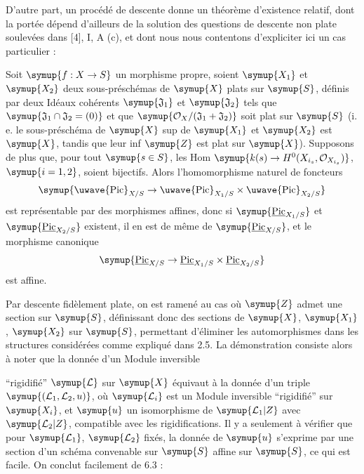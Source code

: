 D'autre part, un procédé de descente donne un théorème d'existence relatif,
dont la portée dépend d'ailleurs de la solution des questions de descente non
plate soulevées dans [4], I, A (c), et dont nous nous contentons d'expliciter
ici un cas particulier :

 Soit $\symup{f:X\to S}$ un morphisme propre,
soient $\symup{X_1}$ et $\symup{X_2}$ deux sous-préschémas de $\symup{X}$ plats sur $\symup{S}$, définis par
deux Idéaux cohérents $\symup{\mathfrak J_1}$ et $\symup{\mathfrak J_2}$ tels que
$\symup{\mathfrak J_1\cap\mathfrak J_2=(0)}$ et que
$\symup{\mathcal O_X/(\mathfrak J_1+\mathfrak J_2)}$ soit plat sur $\symup{S}$ (i. e. le
sous-préschéma de $\symup{X}$ sup de $\symup{X_1}$ et $\symup{X_2}$ est $\symup{X}$, tandis que leur inf $\symup{Z}$
est plat sur $\symup{X}$). Supposons de plus que, pour tout $\symup{s\in S}$, les Hom $\symup{k(s)\to H^0(X_{i_s},\mathcal O_{X_{i_s}})}$,
$\symup{i=1,2}$, soient bijectifs. Alors l'homomorphisme naturel de foncteurs
\[
\symup{\text{\uwave{Pic}}_{X/S}\to
\text{\uwave{Pic}}_{X_1/S}\times\text{\uwave{Pic}}_{X_2/S}}
\]
est représentable par des morphismes affines, donc si
$\symup{\underline{\operatorname{Pic}}_{X_1/S}}$ et $\symup{\underline{\operatorname{Pic}}_{X_2/S}}$ existent, il en
est de même de $\symup{\underline{\operatorname{Pic}}_{X/S}}$, et le morphisme canonique
\[
\symup{\underline{\operatorname{Pic}}_{X/S}\to
\underline{\operatorname{Pic}}_{X_1/S}\times\underline{\operatorname{Pic}}_{X_2/S}}
\]
est affine.

Par descente fidèlement plate, on est ramené au cas où $\symup{Z}$ admet une section
sur $\symup{S}$, définissant donc des sections de $\symup{X}$, $\symup{X_1}$, $\symup{X_2}$ sur $\symup{S}$,
permettant d'éliminer les automorphismes dans les structures considérées comme
expliqué dans 2.5. La démonstration consiste alors à noter que la donnée d'un
Module inversible

``rigidifié'' $\symup{\mathcal L}$ sur $\symup{X}$ équivaut à la donnée d'un triple
$\symup{(\mathcal L_1,\mathcal L_2,u)}$, où $\symup{\mathcal L_i}$ est un Module inversible
``rigidifié'' sur $\symup{X_i}$, et $\symup{u}$ un isomorphisme de
$\symup{\mathcal L_1|Z}$ avec $\symup{\mathcal L_2|Z}$, compatible avec les rigidifications.
Il y a seulement à vérifier que pour $\symup{\mathcal L_1}$, $\symup{\mathcal L_2}$ fixés, la
donnée de $\symup{u}$ s'exprime par une section d'un schéma convenable sur $\symup{S}$ affine
sur $\symup{S}$, ce qui est facile. On conclut facilement de 6.3 :

